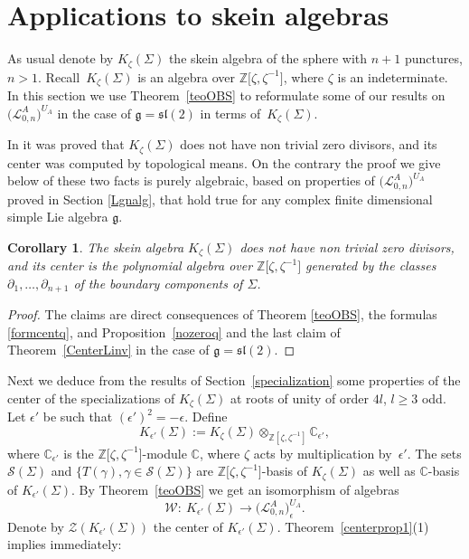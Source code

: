 \documentclass[pdftex]{sigma}%
\numberwithin{equation}{section}
\numberwithin{figure}{section}
\newtheorem{cor}[teo]{Corollary}
\newcommand{\e}{\epsilon}
\newcommand{\mc}{\mathbb{C}}
\newcommand{\mz}{\mathbb{Z}}
\newcommand{\Ll}{{\mathcal L}}
\newcommand{\ra}{\rightarrow}
\begin{document}
\section{Applications to skein algebras}\label{appskein}
As usual denote by $K_\zeta(\Sigma)$ the skein algebra of the sphere with $n+1$ punctures, $n>1$. Recall~$K_\zeta(\Sigma)$ is an algebra over $\mz\big[\zeta,\zeta^{-1}\big]$, where $\zeta$ is an indeterminate. In this section we use Theorem~\ref{teoOBS} to reformulate some of our results on $\big(\Ll_{0,n}^A\big)^{U_A}$ in the case of $\mathfrak{g} = {\mathfrak{sl}}(2)$ in terms of~$K_\zeta(\Sigma)$.

In \cite{BW0,PS} it was proved that $K_\zeta(\Sigma)$ does not have non trivial zero divisors, and its center was computed by topological means. On the contrary the proof we give below of these two facts is purely algebraic, based on properties of $\big(\Ll_{0,n}^A\big)^{U_A}$ proved in Section \ref{Lgnalg}, that hold true for any complex finite dimensional simple Lie algebra $\mathfrak{g}$.

\begin{cor}%
The skein algebra $K_\zeta(\Sigma)$ does not have non trivial zero divisors, and its center is the polynomial algebra over $\mz\big[\zeta,\zeta^{-1}\big]$ generated by the classes $\partial_1,\dots,\partial_{n+1}$ of the boundary components of $\Sigma$.
\end{cor}

\begin{proof}The claims are direct consequences of Theorem \ref{teoOBS}, the formulas \eqref{formcentq}, and Pro\-po\-si\-tion~\ref{nozeroq} and the last claim of Theorem~\ref{CenterLinv} in the case of $\mathfrak{g}={\mathfrak{sl}}(2)$.
\end{proof}

Next we deduce from the results of Section~\ref{specialization} some properties of the center of the spe\-ci\-a\-li\-za\-ti\-ons of $K_\zeta(\Sigma)$ at roots of unity of order $4l$, $l\geq 3$ odd. Let $\epsilon'$ be such that $(\epsilon')^2 = -\epsilon$. Define
\[
K_{\epsilon'}(\Sigma) := K_\zeta(\Sigma)\otimes_{\mz[\zeta,\zeta^{-1}]} \mc_{\epsilon'},
\]
where $\mc_{\epsilon'}$ is the $\mz\big[\zeta,\zeta^{-1}\big]$-module $\mc$, where $\zeta$ acts by multiplication by~$\epsilon'$.
The sets $\mathcal{S}(\Sigma)$ and $\{T(\gamma), \gamma\in \mathcal{S}(\Sigma)\}$ are $\mz\big[\zeta,\zeta^{-1}\big]$-basis of $K_\zeta(\Sigma)$ as well as $\mc$-basis of $K_{\epsilon'}(\Sigma)$. By Theorem~\ref{teoOBS} we get an isomorphism of algebras
\[
\mathcal{W}\colon\ K_{\epsilon'}(\Sigma) \ra \big(\Ll_{0,n}^A\big)^{U_A}_\e.
\]
Denote by $\mathcal{Z}(K_{\epsilon'}(\Sigma))$ the center of $K_{\epsilon'}(\Sigma)$. Theorem~\ref{centerprop1}(1) implies immediately:
\end{document}
